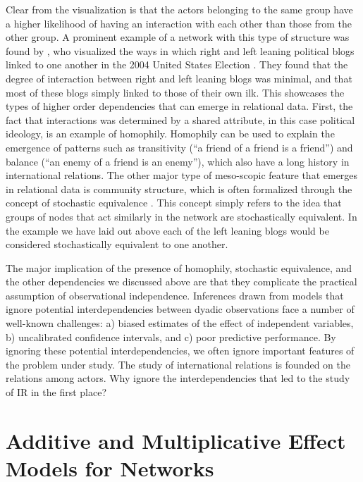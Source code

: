 Clear from the visualization is that the actors belonging to the same group have a higher likelihood of having an interaction with each other than those from the other group. A prominent example of a network with this type of structure was found by \citet{adamic:glance:2005}, who visualized the ways in which right and left leaning political blogs linked to one another in the 2004 United States Election \citep{adamic:glance:2005}. They found that the degree of interaction between right and left leaning blogs was minimal, and that most of these blogs simply linked to those of their own ilk. This showcases the types of higher order dependencies that can emerge in relational data. First, the fact that interactions was determined by a shared attribute, in this case political ideology, is an example of homophily. Homophily can be used to explain the emergence of patterns such as transitivity (``a friend of a friend is a friend'') and balance (``an enemy of a friend is an enemy''), which also have a long history in international relations. The other major type of meso-scopic feature that emerges in relational data is community structure, which is often formalized through the concept of stochastic equivalence \citep{anderson:etal:1992}. This concept simply refers to the idea that groups of nodes that act similarly in the network are stochastically equivalent. In the example we have laid out above each of the left leaning blogs would be considered stochastically equivalent to one another. 

The major implication of the presence of homophily, stochastic equivalence, and the other dependencies we discussed above are that they complicate the practical assumption of observational independence. Inferences drawn from models that ignore potential interdependencies between dyadic observations face a number of well-known challenges: a) biased estimates of the effect of independent variables, b) uncalibrated confidence intervals, and c) poor predictive performance. By ignoring these potential interdependencies, we often ignore important features of the problem under study. The study of international relations is founded on the relations among actors. Why ignore the interdependencies that led to the study of IR in the first place?


\section{\textbf{Additive and Multiplicative Effect Models for Networks}}

